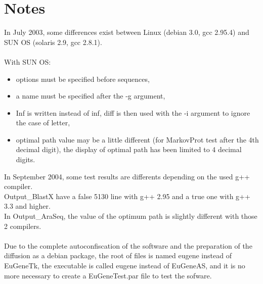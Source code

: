 \documentclass[a4paper,11pt]{article}
\begin{document}
\section{Notes}
In July 2003, some differences exist between Linux (debian 3.0, gcc 2.95.4) and SUN OS (solaris 2.9, gcc 2.8.1). \\
\\
With SUN OS:
\begin{itemize}
\item options must be specified before sequences,
\item a name must be specified after the -g argument,
\item Inf is written instead of inf, diff is then used with the -i argument to ignore the case of letter,
\item optimal path value may be a little different (for MarkovProt test after the 4th decimal digit), the display of optimal path has been limited to 4 decimal digits.
\end{itemize}

In September 2004, some test results are differents depending on the used g++ compiler.\\
Output\_BlastX have a false 5130 line with g++ 2.95 and a true one with g++ 3.3 and higher.\\
In Output\_AraSeq, the value of the optimum path is slightly different with those 2 compilers.\\
\\
Due to the complete autoconfiscation of the software and the preparation of the diffusion as a debian package, the root of files is named eugene instead of EuGeneTk, the executable is called eugene instead of EuGeneAS, and it is no more necessary to create a EuGeneTest.par file to test the sofware.\\
\end{document}

